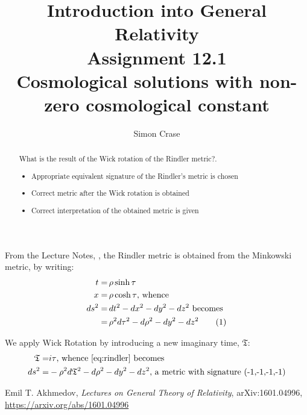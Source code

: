 \documentclass[]{article}
\title{Introduction into General Relativity\\Assignment 12.1\\Cosmological solutions with non-zero cosmological constant}
\author{Simon Crase}
\newcommand\numberthis{\addtocounter{equation}{1}\tag{\theequation}}
\begin{document}
\maketitle

\begin{abstract}
What is the result of the Wick rotation of the Rindler metric?.
\begin{itemize}
	\item  Appropriate equivalent signature of the Rindler's metric is chosen
	\item  Correct metric after the Wick rotation is obtained
	\item  Correct interpretation of the obtained metric is given
\end{itemize}
\end{abstract}


From the Lecture Notes, \cite[I, (9) \& (10)]{Akhmedov2017}, the Rindler metric is obtained from the Minkowski metric, by writing:
\begin{align*}
t=&\, \rho \sinh \tau \\
x=&\, \rho \cosh \tau \text{, whence}\\
ds^2 =&\, dt^2-dx^2-dy^2-dz^2\text{ becomes}\\
=&\, \rho^2 d\tau^2 - d\rho ^2 -dy^2-dz^2\numberthis\label{eq:rindler}
\end{align*}

We apply Wick Rotation by introducing a new imaginary time, $\mathfrak{T}$:
\begin{align*}
\mathfrak{T}=&i\tau\text{, whence \eqref{eq:rindler} becomes}\\
ds^2 =& -\rho^2 d\mathfrak{T}^2 - d\rho^2-dy^2-dz^2\text{, a metric with signature (-1,-1,-1,-1)}
\end{align*}


\begin{thebibliography}{9}\label{section:biblio}
	\raggedright
	Emil T. Akhmedov,
	\emph{Lectures on General Theory of Relativity},
	arXiv:1601.04996,
	\url{https://arxiv.org/abs/1601.04996}
\end{thebibliography}
\end{document}
